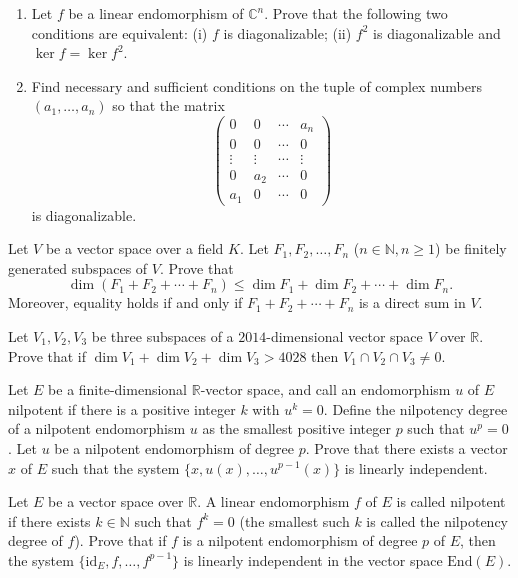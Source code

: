 \documentclass[12pt]{article}
\begin{document}
\begin{problem}
\begin{enumerate}[label=\arabic*.]
\item Let $f$ be a linear endomorphism of $\mathbb{C}^n$. Prove that the following two conditions are equivalent: (i) $f$ is diagonalizable; (ii) $f^2$ is diagonalizable and $\ker f = \ker f^2$.
\item Find necessary and sufficient conditions on the tuple of complex numbers $(a_1,\dots,a_n)$ so that the matrix
\[
\begin{pmatrix}
0 & 0 & \cdots & a_n\\
0 & 0 & \cdots & 0\\
\vdots & \vdots & \cdots & \vdots\\
0 & a_2 & \cdots & 0\\
a_1 & 0 & \cdots & 0
\end{pmatrix}
\]
is diagonalizable.
\end{enumerate}
\end{problem}

\begin{problem}
Let $V$ be a vector space over a field $K$. Let $F_1,F_2,\dots,F_n$ ($n\in\mathbb{N}, n\geq 1$) be finitely generated subspaces of $V$. Prove that
\[ \dim(F_1+F_2+\cdots+F_n) \leq \dim F_1+\dim F_2+\cdots+\dim F_n. \]
Moreover, equality holds if and only if $F_1+F_2+\cdots+F_n$ is a direct sum in $V$.
\end{problem}

\begin{problem}
Let $V_1,V_2,V_3$ be three subspaces of a $2014$-dimensional vector space $V$ over $\mathbb{R}$. Prove that if $\dim V_1+\dim V_2+\dim V_3 > 4028$ then $V_1\cap V_2\cap V_3 \neq 0$.
\end{problem}

\begin{problem}
Let $E$ be a finite-dimensional $\mathbb{R}$-vector space, and call an endomorphism $u$ of $E$ nilpotent if there is a positive integer $k$ with $u^k=0$. Define the nilpotency degree of a nilpotent endomorphism $u$ as the smallest positive integer $p$ such that $u^p=0$. Let $u$ be a nilpotent endomorphism of degree $p$. Prove that there exists a vector $x$ of $E$ such that the system $\{x,u(x),\dots,u^{p-1}(x)\}$ is linearly independent.
\end{problem}

\begin{problem}
Let $E$ be a vector space over $\mathbb{R}$. A linear endomorphism $f$ of $E$ is called nilpotent if there exists $k\in\mathbb{N}$ such that $f^k=0$ (the smallest such $k$ is called the nilpotency degree of $f$). Prove that if $f$ is a nilpotent endomorphism of degree $p$ of $E$, then the system $\{\mathrm{id}_E, f,\dots, f^{p-1}\}$ is linearly independent in the vector space $\mathrm{End}(E)$.
\end{problem}
\end{document}
